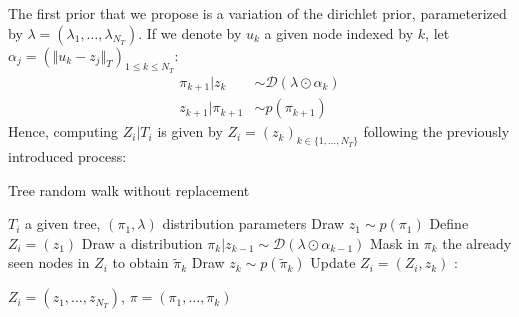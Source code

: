 The first prior that we propose is a variation of the dirichlet prior, parameterized by $\lambda = (\lambda_1, \dots, \lambda_{N_T})$.
If we denote by $u_k$ a given node indexed by $k$, let $\alpha_j = (\Vert u_k - z_j \Vert_T)_{1 \leq k \leq N_T}$:
$$
\begin{align}
    \pi_{k+1} | z_{k} &\sim \mathcal{D}(\lambda \odot \alpha_k) \\
    z_{k+1} | \pi_{k+1} &\sim p(\pi_{k+1})
\end{align}
$$
Hence, computing $Z_i | T_i$ is given by $Z_i = (z_k)_{k \in \{1, \dots, N_T\}}$ following the previously introduced process:
\begin{algorithm}[H]
    \caption{Tree random walk without replacement}
    \begin{algorithmic}[1]
        \REQUIRE $T_i$ a given tree, $(\pi_1, \lambda)$ distribution parameters
        \STATE Draw $z_{1} \sim p(\pi_1)$
        \STATE Define $Z_i = (z_{1})$
            \STATE \quad Draw a distribution $\pi_{k} | z_{k-1} \sim \mathcal{D}(\lambda \odot \alpha_{k-1})$
            \STATE \quad Mask in $\pi_{k}$ the already seen nodes in $Z_i$ to obtain $\tilde{\pi}_{k}$
            \STATE \quad Draw $z_{k} \sim p(\tilde{\pi}_{k})$
            \STATE \quad Update $Z_i = (Z_i, z_k)$
        \EndFor:

        \RETURN{} $Z_i = (z_1, \dots, z_{N_T})$, $\pi = (\pi_1, \dots, \pi_k)$
    \end{algorithmic}


    \label{alg:tree_walk_no_replacement}
\end{algorithm}

